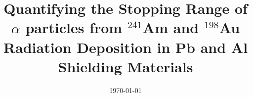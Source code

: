 \documentclass{article}
\title{Quantifying the Stopping Range of $\alpha$ particles from ${}^{241}$Am and ${}^{198}$Au Radiation Deposition in Pb and Al Shielding Materials}
\date{\today}
\begin{document}
\maketitle











\pagebreak


\end{document}
